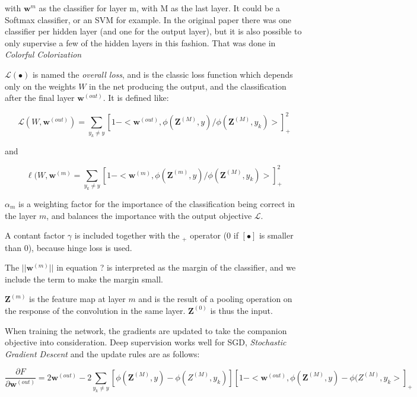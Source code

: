 with $\textbf{w}^{m}$ as the classifier for layer m, with M as the last layer. It could be a Softmax classifier, or an SVM for example. In the original paper there was one classifier per hidden layer (and one for the output layer), but it is also possible to only supervise a few of the hidden layers in this fashion. That was done in \emph{Colorful Colorization} %

$\mathcal{L}(\bullet)$ is named the \emph{overall loss}, and is the classic loss function which depends only on the weights $W$ in the net producing the output, and the classification after the final layer $\textbf{w}^{(out)}$. It is defined like:

\begin{equation}
\mathcal{L}(W, \textbf{w}^{(out)}) = \sum\limits_{y_k \neq y} [1 - < \textbf{w}^{(out)}, \phi(\textbf{Z}^{(M)}, y) / \phi(\textbf{Z}^{(M)}, y_k) >]^{2}_+
\end{equation}

and

\begin{equation}\label{eq:deep_loss}
\ell(W, \textbf{w}^{(m)} = \sum\limits_{y_k \neq y} [1 - < \textbf{w}^{(m)}, \phi(\textbf{Z}^{(m)}, y) / \phi(\textbf{Z}^{(M)}, y_k) >]^{2}_+
\end{equation}

$\alpha_m$ is a weighting factor for the importance of the classification being correct in the layer $m$, and balances the importance with the output objective $\mathcal{L}$.

A contant factor $\gamma$ is included together with the $_+$ operator (0 if $[\bullet]$ is smaller than 0), because hinge loss is used. %

The $||\textbf{w}^{(m)}||$ in equation ?%
 is interpreted as the margin of the classifier, and we include the term to make the margin small. 

$\textbf{Z}^{(m)}$ is the feature map at layer $m$ and is the result of a pooling operation on the response of the convolution in the same layer. $\textbf{Z}^{(0)}$ is thus the input.

When training the network, the gradients are updated to take the companion objective into consideration. Deep supervision works well for SGD, \emph{Stochastic Gradient Descent} and the update rules are as follows:

\begin{equation}
\frac{\partial F}{\partial \textbf{w}^{(out)}} = 2\textbf{w}^{(out)} - 2\sum\limits_{y_k \neq y}[\phi(\textbf{Z}^{(M)},y) - \phi({Z}^{(M)},y_k)][1 - <\textbf{w}^{(out)}, \phi(\textbf{Z}^{(M)},y) - \phi({Z}^{(M)},y_k>]_+
\end{equation}

